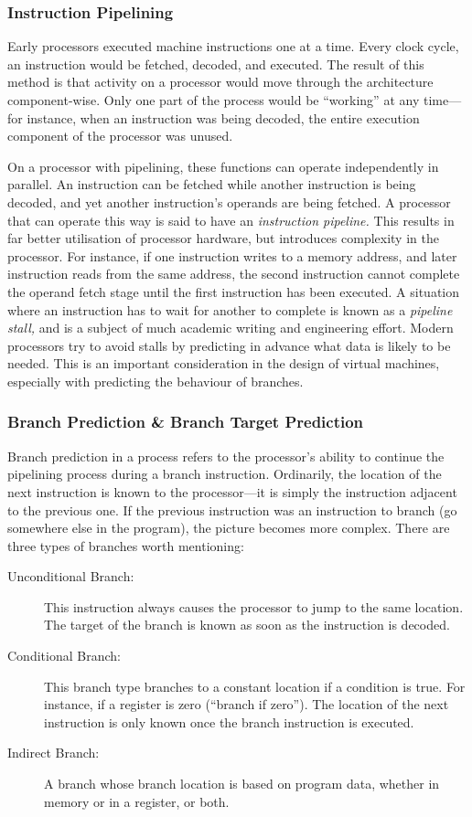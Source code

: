			\subsubsection{Instruction Pipelining}
			Early processors executed machine instructions one at a time. Every clock cycle, an instruction would be fetched, decoded, and executed. The result of this method is that activity on a processor would move through the architecture component-wise. Only one part of the process would be ``working'' at any time---for instance, when an instruction was being decoded, the entire execution component of the processor was unused.
			
			On a processor with pipelining, these functions can operate independently in parallel. An instruction can be fetched while another instruction is being decoded, and yet another instruction's operands are being fetched. A processor that can operate this way is said to have an \emph{instruction pipeline.} This results in far better utilisation of processor hardware, but introduces complexity in the processor. For instance, if one instruction writes to a memory address, and later instruction reads from the same address, the second instruction cannot complete the operand fetch stage until the first instruction has been executed. A situation where an instruction has to wait for another to complete is known as a \emph{pipeline stall,} and is a subject of much academic writing and engineering effort. Modern processors try to avoid stalls by predicting in advance what data is likely to be needed. This is an important consideration in the design of virtual machines, especially with predicting the behaviour of branches.
			
			\subsubsection{Branch Prediction \& Branch Target Prediction}
			Branch prediction in a process refers to the processor's ability to continue the pipelining process during a branch instruction. Ordinarily, the location of the next instruction is known to the processor---it is simply the instruction adjacent to the previous one. If the previous instruction was an instruction to branch (go somewhere else in the program), the picture becomes more complex. There are three types of branches worth mentioning:
			
			\begin{description}
				\item[Unconditional Branch:] This instruction always causes the processor to jump to the same location. The target of the branch is known as soon as the instruction is decoded.
				\item[Conditional Branch:] This branch type branches to a constant location if a condition is true. For instance, if a register is zero (``branch if zero''). The location of the next instruction is only known once the branch instruction is executed.
				\item[Indirect Branch:] A branch whose branch location is based on program data, whether in memory or in a register, or both. 
			\end{description}
			
